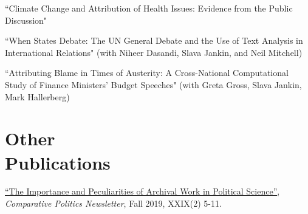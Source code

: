 \documentclass[margin,line,10.95pt]{res}
\begin{document}
\begin{resume}
``Climate Change and Attribution of Health Issues: Evidence from the Public Discussion" 

\vspace*{-3.5mm}
``When States Debate: The UN General Debate and the Use of Text Analysis in International Relations" (with Niheer Dasandi, Slava Jankin, and Neil Mitchell)

\vspace*{-3.5mm}
``Attributing Blame in Times of Austerity: A Cross-National Computational Study of Finance Ministers' Budget Speeches" (with Greta Gross, Slava Jankin, Mark Hallerberg)













\section{\sc Other \\ Publications}

\href{https://www.comparativepoliticsnewsletter.org/wp-content/uploads/2019/12/CP-Newsletter-Fall-19-CP-and-History.pdf}{``The Importance and Peculiarities of Archival Work in Political Science''}, \emph{Comparative Politics Newsletter}, Fall 2019, XXIX(2) 5-11.



\end{resume}
\end{document}
